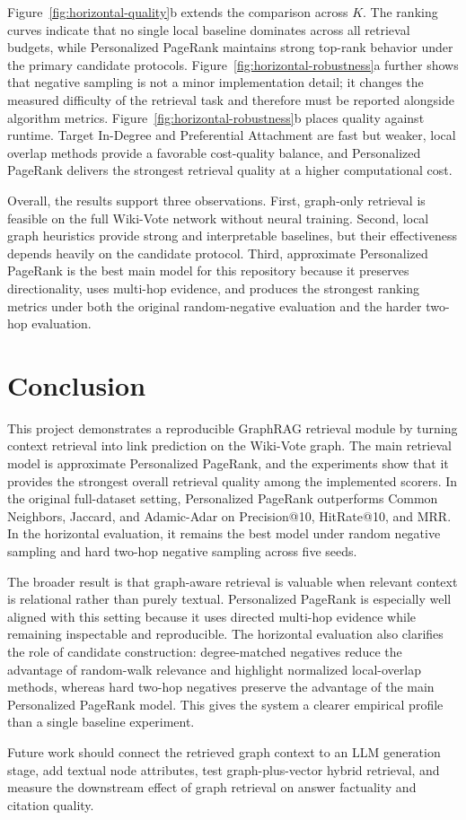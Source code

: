 \documentclass[10pt,twocolumn]{article}
\begin{document}
Figure~\ref{fig:horizontal-quality}b extends the comparison across $K$. The ranking curves indicate that no single local baseline dominates across all retrieval budgets, while Personalized PageRank maintains strong top-rank behavior under the primary candidate protocols. Figure~\ref{fig:horizontal-robustness}a further shows that negative sampling is not a minor implementation detail; it changes the measured difficulty of the retrieval task and therefore must be reported alongside algorithm metrics. Figure~\ref{fig:horizontal-robustness}b places quality against runtime. Target In-Degree and Preferential Attachment are fast but weaker, local overlap methods provide a favorable cost-quality balance, and Personalized PageRank delivers the strongest retrieval quality at a higher computational cost.

Overall, the results support three observations. First, graph-only retrieval is feasible on the full Wiki-Vote network without neural training. Second, local graph heuristics provide strong and interpretable baselines, but their effectiveness depends heavily on the candidate protocol. Third, approximate Personalized PageRank is the best main model for this repository because it preserves directionality, uses multi-hop evidence, and produces the strongest ranking metrics under both the original random-negative evaluation and the harder two-hop evaluation.

\section{Conclusion}
This project demonstrates a reproducible GraphRAG retrieval module by turning context retrieval into link prediction on the Wiki-Vote graph. The main retrieval model is approximate Personalized PageRank, and the experiments show that it provides the strongest overall retrieval quality among the implemented scorers. In the original full-dataset setting, Personalized PageRank outperforms Common Neighbors, Jaccard, and Adamic-Adar on Precision@10, HitRate@10, and MRR. In the horizontal evaluation, it remains the best model under random negative sampling and hard two-hop negative sampling across five seeds.

The broader result is that graph-aware retrieval is valuable when relevant context is relational rather than purely textual. Personalized PageRank is especially well aligned with this setting because it uses directed multi-hop evidence while remaining inspectable and reproducible. The horizontal evaluation also clarifies the role of candidate construction: degree-matched negatives reduce the advantage of random-walk relevance and highlight normalized local-overlap methods, whereas hard two-hop negatives preserve the advantage of the main Personalized PageRank model. This gives the system a clearer empirical profile than a single baseline experiment.

Future work should connect the retrieved graph context to an LLM generation stage, add textual node attributes, test graph-plus-vector hybrid retrieval, and measure the downstream effect of graph retrieval on answer factuality and citation quality.



\end{document}

